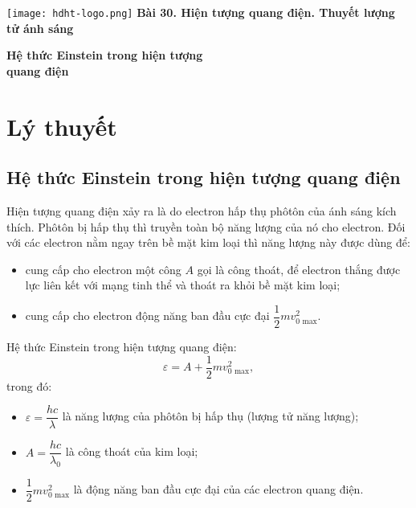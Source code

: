 \newcommand{\chapter}[2][]{
	\newcommand{\chapname}{#2}
	\begin{flushleft}
		\begin{minipage}[t]{\linewidth}
			\texttt{[image: hdht-logo.png]}
			\hspace{0pt}	
			\sffamily\bfseries\large Bài  30. Hiện tượng quang điện. Thuyết lượng tử ánh sáng
			\begin{flushleft}
				\huge\bfseries #1
			\end{flushleft}
		\end{minipage}
	\end{flushleft}
	\vspace{1cm}
	\normalfont\normalsize
}
\chapter[Hệ thức Einstein trong hiện tượng\\ quang điện]{Hệ thức Einstein trong hiện tượng quang điện}

\section{Lý thuyết}

\subsection{Hệ thức Einstein trong hiện tượng quang điện}

Hiện tượng quang điện xảy ra là do electron hấp thụ phôtôn của ánh sáng kích thích. Phôtôn bị hấp thụ thì truyền toàn bộ năng lượng của nó cho electron. Đối với các electron nằm ngay trên bề mặt kim loại thì năng lượng này được dùng để:
\begin{itemize}
	\item cung cấp cho electron một công $A$ gọi là công thoát, để electron thắng được lực liên kết với mạng tinh thể và thoát ra khỏi bề mặt kim loại;
	\item cung cấp cho electron động năng ban đầu cực đại $\dfrac{1}{2}mv_{\text{0 max}}^2$.
\end{itemize}

Hệ thức Einstein trong hiện tượng quang điện:
\begin{equation}
	\varepsilon = A + \dfrac{1}{2}mv_{\text{0 max}}^2,
\end{equation}
trong đó:
\begin{itemize}
	\item $\varepsilon=\dfrac{hc}{\lambda}$ là năng lượng của phôtôn bị hấp thụ (lượng tử năng lượng);
	\item $A=\dfrac{hc}{\lambda_0}$ là công thoát của kim loại;
	\item $\dfrac{1}{2}mv_\text{0 max}^2$ là động năng ban đầu cực đại của các electron quang điện.
\end{itemize}

